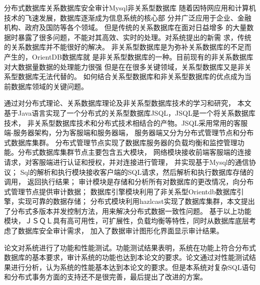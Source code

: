 
\begin{Cabstract}{分布式数据库}{关系数据库}{安全审计}{Mysql}{非关系型数据库}
随着因特网应用和计算机技术的飞速发展，数据库逐渐成为信息系统的核心部
分并广泛应用于企业、金融机构、政府及国防等各个领域。
但是传统的关系数据库在面对日益增多
的大量数据时暴露了很多问题，不能对其高效、实时的处理。对系统提出的新需
求，传统的关系数据库并不能很好的解决。
非关系型数据库是为弥补关系数据库的不足而产生的，OrientDB数据库就
是非关系型数据库的一种。目前现有的非关系数据库对大数据量数据的处理能力很强
但是在在很多关键领域，关系型数据库又是非关系型数据库无法代替的。
如何结合关系型数据库和非关系型数据库的优点成为当前数据库领域的关键问题。

通过对分布式理论、关系数据库理论及非关系型数据库技术的学习和研究，
本文基于Java语言实现了一个分布式的关系型数据库JSQL，JSQL是一个将关系数据库技术，
非关系型数据库技术和分布式技术相结合的产物。JSQL采用常用的客服端-服务器架构，分为客服端和服务器端，
服务器端又分为分布式管理节点和分布式数据库集群。
分布式管理节点实现了数据库服务器的负载均衡和监控管理功能。分布式数据库集群节点主要包含五大模块，
网络模块接收前端客服端的连接请求，对客服端进行认证和授权，并对连接进行管理，
并实现基于Mysql的通信协议；
Sql的解析和执行模块接收客户端的SQL请求，然后解析和执行数据库存储的调用，
返回执行结果；
审计模块是存储和分析所有对数据库的更改情况，向分布式管理节点提供审计数据；
数据库引擎模块利用了非关系型Orientdb数据库引擎，实现可靠的数据存储；
分布式模块利用hazlcast实现了数据库集群，本文提出了分布式多版本并发控制方法，用来解决分布式数据一致性问题。
基于以上功能模块，ＪＳＱＬ具有高可用性，可扩展性，负载均衡等特性，同时从数据库底层考虑了数据库安全审计需求，
加入了数据审计图形化界面显示审计结果。

论文对系统进行了功能和性能测试。功能测试结果表明，系统在功能上符合分布式数据库的基本要求，审计系统的功能也达到本论文的要求。论文通过对性能测试结果进行分析，认为系统的性能基本达到本论文的要求。但是本系统对复杂SQL语句和分布式事务方面的支持还不是很完善，最后提出了改进的方案。
\end{Cabstract}